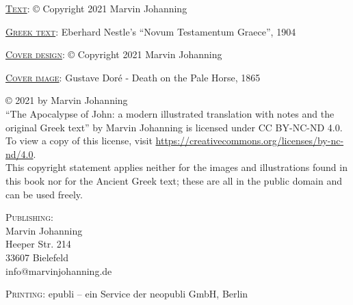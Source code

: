\thispagestyle{empty}
\noindent\textsc{\underline{Text}}: © Copyright 2021 Marvin Johanning

\noindent\textsc{\underline{Greek text}}: Eberhard Nestle's ``Novum Testamentum Graece'', 1904

\noindent\textsc{\underline{Cover design}}: © Copyright 2021 Marvin Johanning

\noindent\textsc{\underline{Cover image}}: Gustave Doré - Death on the Pale Horse, 1865

\bigskip

\noindent© 2021 by Marvin Johanning \ccbyncnd\\``The Apocalypse of John: a modern illustrated translation with notes and the original Greek text'' by Marvin Johanning is licensed under CC BY-NC-ND 4.0. To view a copy of this license, visit \url{https://creativecommons.org/licenses/by-nc-nd/4.0}.\\This copyright statement applies neither for the images and illustrations found in this book nor for the Ancient Greek text; these are all in the public domain and can be used freely.

\vspace{10mm}\noindent\textsc{Publishing}: \\
Marvin Johanning\\
Heeper Str.  214\\
33607 Bielefeld\\
info@marvinjohanning.de

\vspace{5mm}\noindent\textsc{Printing}: epubli – ein Service der neopubli GmbH, Berlin
\newpage
